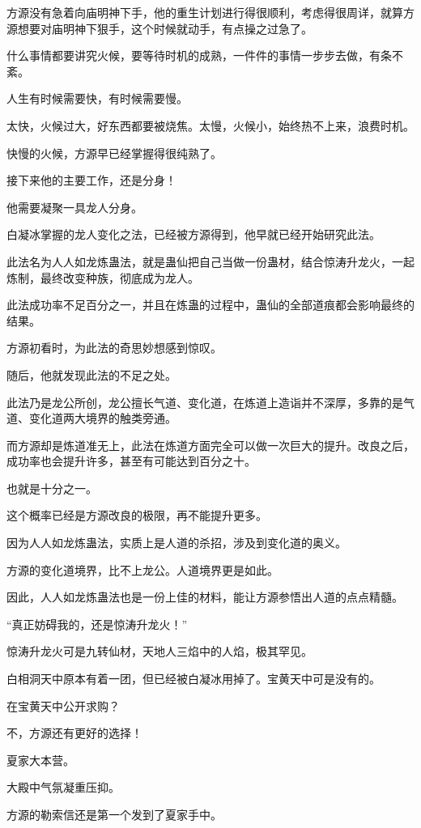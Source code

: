 \begin{this_body}
方源没有急着向庙明神下手，他的重生计划进行得很顺利，考虑得很周详，就算方源想要对庙明神下狠手，这个时候就动手，有点操之过急了。

什么事情都要讲究火候，要等待时机的成熟，一件件的事情一步步去做，有条不紊。

人生有时候需要快，有时候需要慢。

太快，火候过大，好东西都要被烧焦。太慢，火候小，始终热不上来，浪费时机。

快慢的火候，方源早已经掌握得很纯熟了。

接下来他的主要工作，还是分身！

他需要凝聚一具龙人分身。

白凝冰掌握的龙人变化之法，已经被方源得到，他早就已经开始研究此法。

此法名为人人如龙炼蛊法，就是蛊仙把自己当做一份蛊材，结合惊涛升龙火，一起炼制，最终改变种族，彻底成为龙人。

此法成功率不足百分之一，并且在炼蛊的过程中，蛊仙的全部道痕都会影响最终的结果。

方源初看时，为此法的奇思妙想感到惊叹。

随后，他就发现此法的不足之处。

此法乃是龙公所创，龙公擅长气道、变化道，在炼道上造诣并不深厚，多靠的是气道、变化道两大境界的触类旁通。

而方源却是炼道准无上，此法在炼道方面完全可以做一次巨大的提升。改良之后，成功率也会提升许多，甚至有可能达到百分之十。

也就是十分之一。

这个概率已经是方源改良的极限，再不能提升更多。

因为人人如龙炼蛊法，实质上是人道的杀招，涉及到变化道的奥义。

方源的变化道境界，比不上龙公。人道境界更是如此。

因此，人人如龙炼蛊法也是一份上佳的材料，能让方源参悟出人道的点点精髓。

“真正妨碍我的，还是惊涛升龙火！”

惊涛升龙火可是九转仙材，天地人三焰中的人焰，极其罕见。

白相洞天中原本有着一团，但已经被白凝冰用掉了。宝黄天中可是没有的。

在宝黄天中公开求购？

不，方源还有更好的选择！

夏家大本营。

大殿中气氛凝重压抑。

方源的勒索信还是第一个发到了夏家手中。


\end{this_body}
